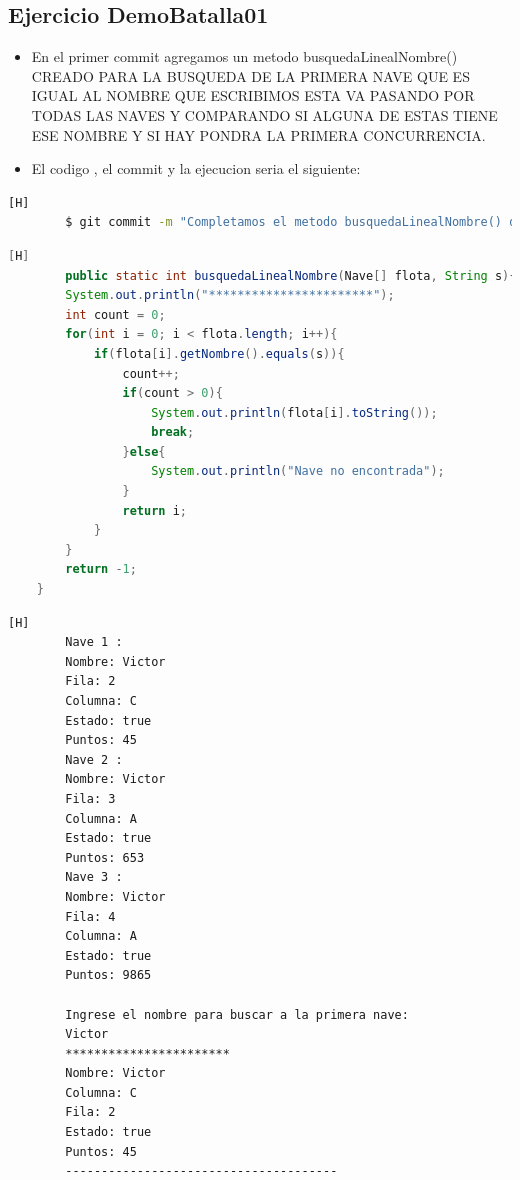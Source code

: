 \documentclass{article}
\begin{document}
	\subsection{Ejercicio DemoBatalla01}
	\begin{itemize}	
		\item En el primer commit agregamos un metodo busquedaLinealNombre() CREADO PARA LA BUSQUEDA DE LA PRIMERA NAVE QUE ES IGUAL AL NOMBRE QUE ESCRIBIMOS ESTA VA PASANDO POR TODAS LAS NAVES Y COMPARANDO SI ALGUNA DE ESTAS TIENE ESE NOMBRE Y SI HAY PONDRA LA PRIMERA CONCURRENCIA. 
		\item El codigo , el commit y la ejecucion seria el siguiente:
	\end{itemize}	
	\begin{lstlisting}[language=bash,caption={Commit}][H]
		$ git commit -m "Completamos el metodo busquedaLinealNombre() donde el nombre ingresado por el usuario buscara la primera igualidad a esta y tambien devolvera su posicion que sera un int"
	\end{lstlisting}	
	\begin{lstlisting}[language=java,caption={Las lineas de codigos del metodo creado:}][H]
		public static int busquedaLinealNombre(Nave[] flota, String s){ //METODO CREADO PARA LA BUSQUEDA DE LA PRIMERA NAVE QUE ES IGUAL AL NOMBRE QUE ESCRIBIMOS
        System.out.println("***********************");
        int count = 0;
        for(int i = 0; i < flota.length; i++){
            if(flota[i].getNombre().equals(s)){
                count++;
                if(count > 0){
                    System.out.println(flota[i].toString());
                    break;
                }else{
                    System.out.println("Nave no encontrada");
                }
                return i;
            }
        }
        return -1;
    }
	\end{lstlisting}
	\begin{lstlisting}[language=bash,caption={La ejecucion dada:}][H]
		Nave 1 : 
		Nombre: Victor
		Fila: 2
		Columna: C
		Estado: true
		Puntos: 45
		Nave 2 : 
		Nombre: Victor
		Fila: 3
		Columna: A
		Estado: true
		Puntos: 653
		Nave 3 : 
		Nombre: Victor
		Fila: 4
		Columna: A
		Estado: true
		Puntos: 9865

		Ingrese el nombre para buscar a la primera nave: 
		Victor
		***********************
		Nombre: Victor
		Columna: C
		Fila: 2
		Estado: true
		Puntos: 45
		--------------------------------------

    \end{lstlisting}
\end{document}
